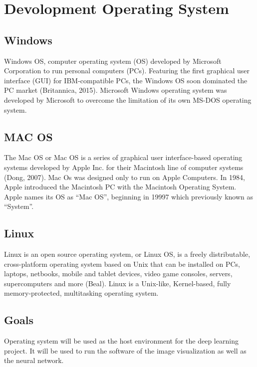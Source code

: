 \section{Devolopment Operating System}

\subsection{Windows}
Windows OS, computer operating system (OS) developed by Microsoft Corporation to run personal
computers (PCs). Featuring the first graphical user interface (GUI) for IBM-compatible PCs, the Windows
OS soon dominated the PC market (Britannica, 2015). Microsoft Windows operating system was
developed by Microsoft to overcome the limitation of its own MS-DOS operating system.

\subsection{MAC OS}
The Mac OS or Mac OS is a series of graphical user interface-based operating systems developed by
Apple Inc. for their Macintosh line of computer systems (Dong, 2007). Mac Os was designed only to run
on Apple Computers. In 1984, Apple introduced the Macintosh PC with the Macintosh Operating
System. Apple names its OS as “Mac OS”, beginning in 19997 which previously known as “System”.

\subsection{Linux}
Linux is an open source operating system, or Linux OS, is a freely distributable, cross-platform operating
system based on Unix that can be installed on PCs, laptops, netbooks, mobile and tablet devices, video
game consoles, servers, supercomputers and more (Beal). Linux is a Unix-like, Kernel-based, fully
memory-protected, multitasking operating system.

\subsection{Goals}
Operating system will be used as the host environment for the deep learning project.
It will be used to run the software of the image visualization as well as the neural network.

